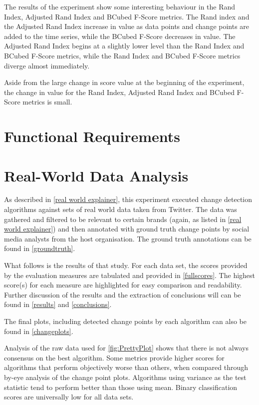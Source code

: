 \documentclass{uvamscse}	%
\begin{document}
The results of the experiment show some interesting behaviour in the Rand Index, Adjusted Rand Index and BCubed F-Score metrics. The Rand index and the Adjusted Rand Index increase in value as data points and change points are added to the time series, while the BCubed F-Score decreases in value. The Adjusted Rand Index begins at a slightly lower level than the Rand Index and BCubed F-Score metrics, while the Rand Index and BCubed F-Score metrics diverge almost immediately.

Aside from the large change in score value at the beginning of the experiment, the change in value for the Rand Index, Adjusted Rand Index and BCubed F-Score metrics is small.

\section{Functional Requirements}

\section{Real-World Data Analysis}

As described in \autoref{real world explainer}, this experiment executed change detection algorithms against sets of real world data taken from Twitter. The data was gathered and filtered to be relevant to certain brands (again, as listed in \autoref{real world explainer}) and then annotated with ground truth change points by social media analysts from the host organisation. The ground truth annotations can be found in \autoref{groundtruth}.

What follows is the results of that study. For each data set, the scores provided by the evaluation measures are tabulated and provided in \autoref{fullscores}. The highest score(s) for each measure are highlighted for easy comparison and readability. Further discussion of the results and the extraction of conclusions will can be found in \autoref{results} and \autoref{conclusions}.

The final plots, including detected change points by each algorithm can also be found in \autoref{changeplots}.

Analysis of the raw data used for \autoref{fig:PrettyPlot} shows that there is not always consensus on the best algorithm. Some metrics provide higher scores for algorithms that perform objectively worse than others, when compared through by-eye analysis of the change point plots. Algorithms using variance as the test statistic tend to perform better than those using mean. Binary classification scores are universally low for all data sets.
\end{document}
